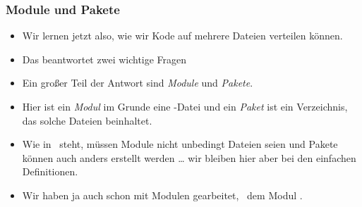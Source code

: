 \documentclass[aspectratio=169,mathserif,notheorems]{beamer}%
\begin{document}
\begin{frame}%
\frametitle{Module und Pakete}%
\begin{itemize}%
%
\item Wir lernen jetzt also, wie wir Kode auf mehrere Dateien verteilen können.%
%
\item<2-> Das beantwortet zwei wichtige Fragen%
%
\item<5-> Ein großer Teil der Antwort sind \emph{Module} und \emph{Pakete}.%
%
\item<6-> Hier ist ein \emph{Modul} im Grunde eine \python-Datei und ein \emph{Paket} ist ein Verzeichnis, das solche Dateien beinhaltet.%
%
\item<7-> Wie in~ steht, müssen Module nicht unbedingt Dateien seien und Pakete können auch anders erstellt werden {\dots} wir bleiben hier aber bei den einfachen Definitionen.%
%
\item<8-> Wir haben ja auch schon mit Modulen gearbeitet, \DEzB\ dem Modul .%
%
\end{itemize}%
\end{frame}%
%
\end{document}

